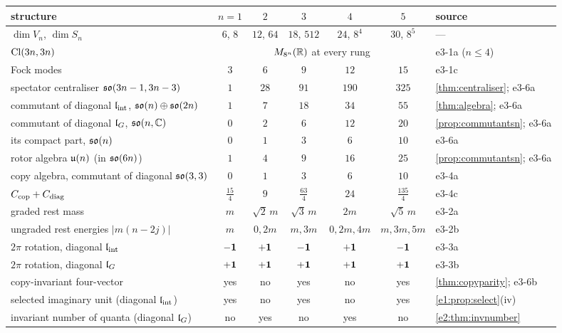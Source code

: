 \begin{table}[t]
\centering
\footnotesize
\setlength{\tabcolsep}{4pt}
\begin{tabular}{@{}>{\raggedright\arraybackslash}p{4.5cm}ccccc>{\raggedright\arraybackslash}p{2.9cm}@{}}
\toprule
structure & $n=1$ & $2$ & $3$ & $4$ & $5$ & source\\
\midrule
$\dim V_n$, $\dim S_n$ & $6$, $8$ & $12$, $64$ & $18$, $512$ & $24$, $8^4$ & $30$, $8^5$ & ---\\
$\mathrm{Cl}(3n,3n)$ & \multicolumn{5}{c}{$M_{8^n}(\mathbb{R})$ at every rung} & e3-1a ($n\le4$)\\
Fock modes & $3$ & $6$ & $9$ & $12$ & $15$ & e3-1c\\
spectator centraliser $\mathfrak{so}(3n-1,3n-3)$ & $1$ & $28$ & $91$ & $190$ & $325$ & \cref{thm:centraliser}; e3-6a\\
commutant of diagonal $\mathfrak l_{\rm int}$, $\mathfrak{so}(n)\oplus\mathfrak{so}(2n)$ & $1$ & $7$ & $18$ & $34$ & $55$ & \cref{thm:algebra}; e3-6a\\
commutant of diagonal $\mathfrak l_G$, $\mathfrak{so}(n,\mathbb{C})$ & $0$ & $2$ & $6$ & $12$ & $20$ & \cref{prop:commutantsn}; e3-6a\\
its compact part, $\mathfrak{so}(n)$ & $0$ & $1$ & $3$ & $6$ & $10$ & e3-6a\\
rotor algebra $\mathfrak{u}(n)$ (in $\mathfrak{so}(6n)$) & $1$ & $4$ & $9$ & $16$ & $25$ & \cref{prop:commutantsn}; e3-6a\\
copy algebra, commutant of diagonal $\mathfrak{so}(3,3)$ & $0$ & $1$ & $3$ & $6$ & $10$ & e3-4a\\
$C_{\rm cop}+C_{\rm diag}$ & $\tfrac{15}4$ & $9$ & $\tfrac{63}4$ & $24$ & $\tfrac{135}4$ & e3-4c\\
graded rest mass & $m$ & $\sqrt2\,m$ & $\sqrt3\,m$ & $2m$ & $\sqrt5\,m$ & e3-2a\\
ungraded rest energies $|m(n-2j)|$ & $m$ & $0,2m$ & $m,3m$ & $0,2m,4m$ & $m,3m,5m$ & e3-2b\\
$2\pi$ rotation, diagonal $\mathfrak l_{\rm int}$ & $-\mathbf 1$ & $+\mathbf 1$ & $-\mathbf 1$ & $+\mathbf 1$ & $-\mathbf 1$ & e3-3a\\
$2\pi$ rotation, diagonal $\mathfrak l_G$ & $+\mathbf 1$ & $+\mathbf 1$ & $+\mathbf 1$ & $+\mathbf 1$ & $+\mathbf 1$ & e3-3b\\
copy-invariant four-vector & yes & no & yes & no & yes & \cref{thm:copyparity}; e3-6b\\
selected imaginary unit (diagonal $\mathfrak l_{\rm int}$) & yes & no & yes & no & yes & \cref{e1:prop:select}(iv)\\
invariant number of quanta (diagonal $\mathfrak l_G$) & no & yes & no & yes & no & \cref{e2:thm:invnumber}\\

\end{tabular}
\end{table}
